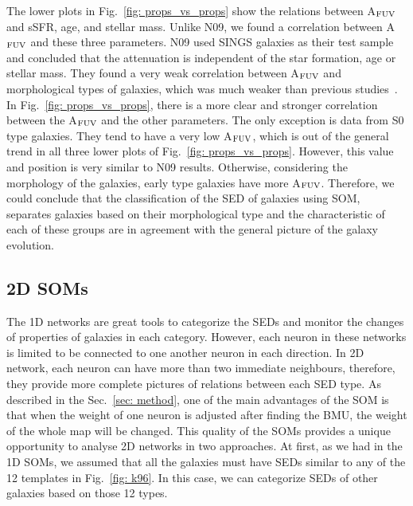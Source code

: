         The lower plots in Fig.~\ref{fig: props_vs_props} show the relations between A$_{\rm {FUV}}$ and sSFR, age, and stellar mass.
        Unlike N09, we found a correlation between A$_{\rm {FUV}}$ and these three parameters.
        N09 used SINGS galaxies as their test sample and concluded that the attenuation is independent of the star formation, age or stellar mass.
        They found a very weak correlation between A$_{\rm {FUV}}$ and morphological types of galaxies, which was much weaker than previous studies~\citep[e.g.][]{Dale07}.
        In Fig.~\ref{fig: props_vs_props}, there is a more clear and stronger correlation between the A$_{\rm {FUV}}$ and the other parameters.
        The only exception is data from S0 type galaxies.
        They tend to have a very low A$_{\rm {FUV}}$, which is out of the general trend in all three lower plots of Fig.~\ref{fig: props_vs_props}. 
        However, this value and position is very similar to N09 results. %
        Otherwise, considering the morphology of the galaxies, early type galaxies have more A$_{\rm {FUV}}$.
        Therefore, we could conclude that the classification of the SED of galaxies using SOM, separates galaxies based on their morphological type and the characteristic of each of these groups are in agreement with the general picture of the galaxy evolution. %

    \subsection{2D SOMs}
    \label{sec: 2D}
    The 1D networks are great tools to categorize the SEDs and monitor the changes of properties of galaxies in each category.
    However, each neuron in these networks is limited to be connected to one another neuron in each direction.
    In 2D network, each neuron can have more than two immediate neighbours, therefore, they provide more complete pictures of relations between each SED type.
    As described in the Sec.~\ref{sec: method}, one of the main advantages of the SOM is that when the weight of one neuron is adjusted after finding the BMU, the weight of the whole map will be changed. %
    This quality of the SOMs provides a unique opportunity to analyse 2D networks in two approaches. 
    At first, as we had in the 1D SOMs, we assumed that all the galaxies must have SEDs similar to any of the 12 templates in Fig.~\ref{fig: k96}.
    In this case, we can categorize SEDs of other galaxies based on those 12 types.
    
